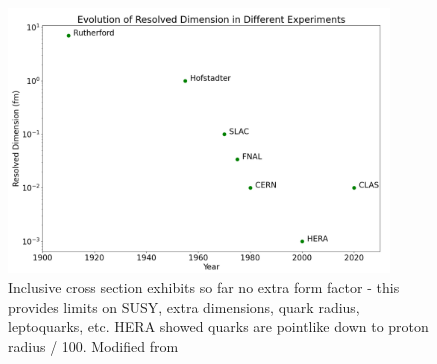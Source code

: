 \begin{figure}
    \centering
    \includegraphics[width=0.9\textwidth]{Chapters/Ch1-Intro/Ch1-Sec2-GPDs-DVMP/pics/scaling.png}
    \caption{Inclusive cross section exhibits so far no extra form factor - this provides limits on SUSY, extra dimensions, quark radius, leptoquarks, etc. HERA showed quarks are pointlike down to proton radius / 100. Modified from \cite{Klein2005ResolvingHERA}}
    \label{fig:enter-label}
\end{figure}



